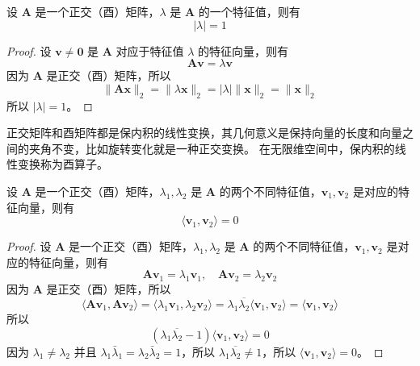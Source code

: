 \begin{corollary}[正交（酉）矩阵的特征值的绝对值为 1]
    设 $\mathbf{A}$ 是一个正交（酉）矩阵，$\lambda$ 是 $\mathbf{A}$ 的一个特征值，则有
    \[
        |\lambda| = 1
    \]
\end{corollary}
\begin{proof}
    设 $\mathbf{v} \neq \mathbf{0}$ 是 $\mathbf{A}$ 对应于特征值 $\lambda$ 的特征向量，则有
    \[
        \mathbf{A}\mathbf{v} = \lambda \mathbf{v}
    \]
    因为 $\mathbf{A}$ 是正交（酉）矩阵，所以 
    \[
        \|\mathbf{A}\mathbf{x}\|_2 = \|\lambda \mathbf{x}\|_2 = |\lambda| \|\mathbf{x}\|_2 = \|\mathbf{x}\|_2
    \]
    所以 $|\lambda| = 1$。
\end{proof}

\begin{note}
    正交矩阵和酉矩阵都是保内积的线性变换，其几何意义是保持向量的长度和向量之间的夹角不变，比如旋转变化就是一种正交变换。
    在无限维空间中，保内积的线性变换称为酉算子。
\end{note}
\vspace{0.5em}

\begin{proposition}[正交（酉）矩阵不同特征值对应的特征向量是正交的]
    设 $\mathbf{A}$ 是一个正交（酉）矩阵，$\lambda_1,\lambda_2$ 是 $\mathbf{A}$ 的两个不同特征值，$\mathbf{v}_1,\mathbf{v}_2$ 是对应的特征向量，则有
    \[
        \langle \mathbf{v}_1,\mathbf{v}_2 \rangle = 0
    \]
\end{proposition}
\begin{proof}
    设 $\mathbf{A}$ 是一个正交（酉）矩阵，$\lambda_1,\lambda_2$ 是 $\mathbf{A}$ 的两个不同特征值，$\mathbf{v}_1,\mathbf{v}_2$ 是对应的特征向量，则有
    \[
        \mathbf{A}\mathbf{v}_1 = \lambda_1 \mathbf{v}_1, \quad \mathbf{A}\mathbf{v}_2 = \lambda_2 \mathbf{v}_2
    \]
    因为 $\mathbf{A}$ 是正交（酉）矩阵，所以 
    \[
        \langle \mathbf{A}\mathbf{v}_1,\mathbf{A}\mathbf{v}_2 \rangle = \langle \lambda_1 \mathbf{v}_1,\lambda_2 \mathbf{v}_2 \rangle = \lambda_1 \overline{\lambda_2} \langle \mathbf{v}_1,\mathbf{v}_2 \rangle = \langle \mathbf{v}_1,\mathbf{v}_2 \rangle
    \]
    所以 
    \[
        (\lambda_1 \overline{\lambda_2} - 1) \langle \mathbf{v}_1,\mathbf{v}_2 \rangle = 0
    \]
    因为 $\lambda_1 \neq \lambda_2$ 并且 $\lambda_1\bar{\lambda}_1 = \lambda_2\bar{\lambda}_2 = 1$，所以 $\lambda_1 \overline{\lambda_2}  \neq 1$，所以 $\langle \mathbf{v}_1,\mathbf{v}_2 \rangle = 0$。
\end{proof}

\vspace{1em}
